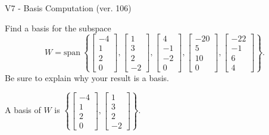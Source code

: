 \begin{exercise}
  \begin{exerciseTitle}V7 - Basis Computation (ver. 106)\end{exerciseTitle}
  \begin{exerciseStatement}
    Find a basis for the subspace 
\[W=\mathrm{span}\ \left\{\left[\begin{array}{r}
-4 \\
1 \\
2 \\
0
\end{array}\right] , \left[\begin{array}{r}
1 \\
3 \\
2 \\
-2
\end{array}\right] , \left[\begin{array}{r}
4 \\
-1 \\
-2 \\
0
\end{array}\right] , \left[\begin{array}{r}
-20 \\
5 \\
10 \\
0
\end{array}\right] , \left[\begin{array}{r}
-22 \\
-1 \\
6 \\
4
\end{array}\right]\right\}.\]
 Be sure to explain why your result is a basis.


  \end{exerciseStatement}
  \begin{exerciseAnswer}
   A basis of \(W\) is  \(\left\{\left[\begin{array}{r}
-4 \\
1 \\
2 \\
0
\end{array}\right] , \left[\begin{array}{r}
1 \\
3 \\
2 \\
-2
\end{array}\right]\right\}\).
  


  \end{exerciseAnswer}
\end{exercise}